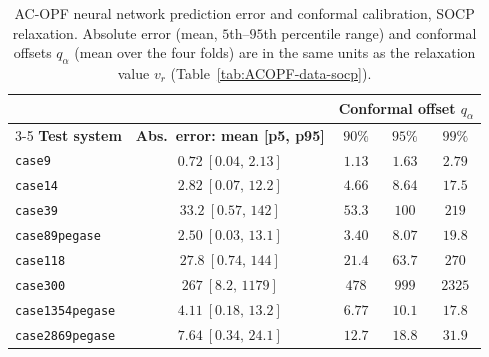 \documentclass[10pt]{article} %
\theoremstyle{plain}
\theoremstyle{definition}
\theoremstyle{remark}
\begin{document}
\begin{table}[H]
\centering
\footnotesize
\caption{AC-OPF neural network prediction error and conformal calibration, SOCP relaxation. Absolute error (mean, $5$th--$95$th percentile range) and conformal offsets $q_\alpha$ (mean over the four folds) are in the same units as the relaxation value $v_r$ (Table~\ref{tab:ACOPF-data-socp}).}
\begin{tabular}{lc ccc}
\toprule
& & \multicolumn{3}{c}{\textbf{Conformal offset } $q_\alpha$} \\
\cmidrule(lr){3-5}
\textbf{Test system} & \textbf{Abs.\ error: mean [p5, p95]} & $90\%$ & $95\%$ & $99\%$ \\
\midrule
\texttt{case9}          & $0.72\ [0.04,\,2.13]$    & $1.13$  & $1.63$  & $2.79$  \\
\texttt{case14}         & $2.82\ [0.07,\,12.2]$    & $4.66$  & $8.64$  & $17.5$  \\
\texttt{case39}         & $33.2\ [0.57,\,142]$     & $53.3$  & $100$   & $219$   \\
\texttt{case89pegase}   & $2.50\ [0.03,\,13.1]$    & $3.40$  & $8.07$  & $19.8$  \\
\texttt{case118}        & $27.8\ [0.74,\,144]$     & $21.4$  & $63.7$  & $270$   \\
\texttt{case300}        & $267\ [8.2,\,1179]$      & $478$   & $999$   & $2325$  \\
\texttt{case1354pegase} & $4.11\ [0.18,\,13.2]$    & $6.77$  & $10.1$  & $17.8$  \\
\texttt{case2869pegase} & $7.64\ [0.34,\,24.1]$    & $12.7$  & $18.8$  & $31.9$  \\
\bottomrule
\end{tabular}
\label{tab:ACOPF-error-socp}
\end{table}
\end{document}
